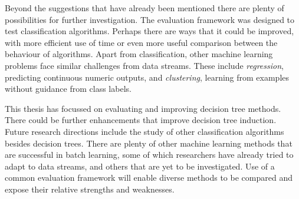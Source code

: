 Beyond the suggestions that have already been mentioned there are plenty of possibilities for further investigation. 
The evaluation framework was designed to test classification algorithms. Perhaps there are ways that it could be improved, with more efficient use of time or even more useful comparison between the behaviour of algorithms.
Apart from classification, other machine learning problems face similar challenges from data streams. These include {\em regression}, predicting continuous numeric outputs, and {\em clustering}, learning from examples without guidance from class labels.

This thesis has focussed on evaluating and improving decision tree methods. There could be further enhancements that improve decision tree induction. Future research directions include the study of other classification algorithms besides decision trees. There are plenty of other machine learning methods that are successful in batch learning, some of which researchers have already tried to adapt to data streams, and others that are yet to be investigated. Use of a common evaluation framework will enable diverse methods to be compared and expose their relative strengths and weaknesses.